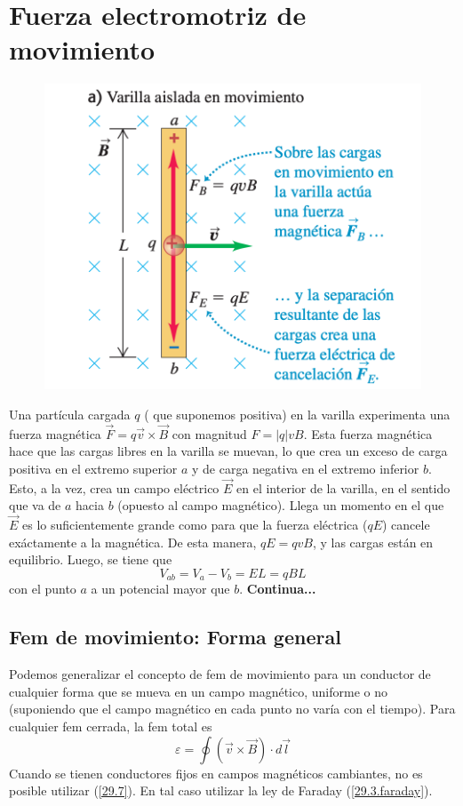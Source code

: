 \section{Fuerza electromotriz de movimiento}
\begin{figure}[h]
\centering
\includegraphics[scale=0.5]{fig/varilla}
\end{figure}
Una partícula cargada $q$ (	que suponemos positiva) en la varilla experimenta una fuerza magnética $\vec{F}=q\vec{v}\times\vec{B}$ con magnitud $F=|q|vB$. Esta fuerza magnética hace que las cargas libres en la varilla se muevan, lo que crea un exceso de carga positiva en el extremo superior $a$ y de carga negativa en el extremo inferior $b$.
Esto, a la vez, crea un campo eléctrico $\vec{E}$ en el interior de la varilla, en el sentido que va de $a$ hacia $b$ (opuesto al campo magnético). Llega un momento en el que $\vec{E}$ es lo suficientemente grande como para que la fuerza eléctrica ($qE$) cancele exáctamente a la magnética. De esta manera, $qE=qvB$, y las cargas están en equilibrio. Luego, se tiene que
\begin{equation}\label{29.5}
V_{ab}=V_a-V_b=EL=qBL
\end{equation}
con el punto $a$ a un potencial mayor que $b$.
\textbf{Continua...}
\subsection{Fem de movimiento: Forma general}
Podemos generalizar el concepto de fem de movimiento para un conductor de cualquier forma que se mueva en un campo magnético, uniforme o no (suponiendo que el campo magnético en cada punto no varía con el tiempo). Para cualquier fem cerrada, la fem total es
\begin{equation}\label{29.7}
\varepsilon=\oint (\vec{v}\times\vec{B})\cdot d\vec{l}
\end{equation}
Cuando se tienen conductores fijos en campos magnéticos cambiantes, no es posible utilizar (\ref{29.7}). En tal caso utilizar la ley de Faraday (\ref{29.3.faraday}).


